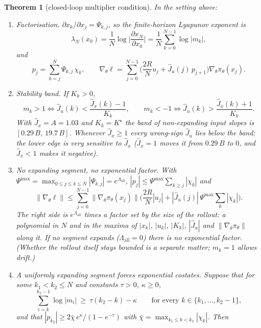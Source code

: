 \documentclass[11pt]{article}
\theoremstyle{plainnote}
\newtheorem{theorem}{Theorem}
\newcommand{\Jx}{\hat J_x}
\newcommand{\Ju}{\hat J_u}
\begin{document}
\begin{theorem}[closed-loop multiplier condition]\label{thm:mult}
In the setting above:
\begin{enumerate}
\item[(a)] Factorisation. $\partial x_k/\partial x_j=\Psi_{k,j}$, so the finite-horizon Lyapunov exponent is
\[
\lambda_N(x_0)=\frac1N\log\Big|\frac{\partial x_N}{\partial x_0}\Big|=\frac1N\sum_{k=0}^{N-1}\log|m_k|,
\]
and
\begin{equation}
p_j=\sum_{k=j}^{N}\Psi_{k,j}\,\chi_k,\qquad
\nabla_\theta\ell=\sum_{j=0}^{N-1}\Big(\frac{2R}{N}u_j+\Ju(j)\,p_{j+1}\Big)\nabla_\theta\pi_\theta(x_j).
\label{eq:costate}
\end{equation}
\item[(b)] Stability band. If $K_k>0$,
\begin{equation}
m_k>1\iff\Ju(k)<\frac{\Jx(k)-1}{K_k},\qquad m_k<-1\iff\Ju(k)>\frac{\Jx(k)+1}{K_k}.
\label{eq:band}
\end{equation}
With $\Jx=A=1.03$ and $K_k=K^\star$ the band of non-expanding input slopes is $[0.29\,B,\ 19.7\,B]$. Whenever $\Jx\ge1$ every wrong-sign $\Ju$ lies below the band; the lower edge is very sensitive to $\Jx$ ($\Jx=1$ moves it from $0.29\,B$ to $0$, and $\Jx<1$ makes it negative).
\item[(c)] No expanding segment, no exponential factor. With $\Psi^{\max}=\max_{0\le j\le k\le N}|\Psi_{k,j}|=e^{\Lambda_{\mathrm{all}}}$, $|p_j|\le\Psi^{\max}\sum_{k\ge j}|\chi_k|$ and
\begin{equation}
\|\nabla_\theta\ell\|\le\sum_{j=0}^{N-1}\|\nabla_\theta\pi_\theta(x_j)\|\Big(\frac{2R}{N}|u_j|+|\Ju(j)|\,\Psi^{\max}\sum_{k}|\chi_k|\Big).
\end{equation}
The right side is $e^{\Lambda_{\mathrm{all}}}$ times a factor set by the size of the rollout: a polynomial in $N$ and in the maxima of $|x_k|$, $|u_k|$, $|K_k|$, $|\Ju|$ and $\|\nabla_\theta\pi_\theta\|$ along it. If no segment expands ($\Lambda_{\mathrm{all}}=0$) there is no exponential factor. (Whether the rollout itself stays bounded is a separate matter; $m_k=1$ allows drift.)
\item[(d)] A uniformly expanding segment forces exponential costates. Suppose that for some $k_1<k_2\le N$ and constants $\tau>0$, $\kappa\ge0$,
\begin{equation}
\sum_{i=k}^{k_2-1}\log|m_i|\ \ge\ \tau(k_2-k)-\kappa\qquad\text{for every }k\in\{k_1,\dots,k_2-1\},
\label{eq:unif}
\end{equation}
and that $|p_{k_2}|\ge2\bar\chi\,e^{\kappa}/(1-e^{-\tau})$ with $\bar\chi=\max_{k_1\le k<k_2}|\chi_k|$. Then

\end{enumerate}
\end{theorem}
\end{document}
